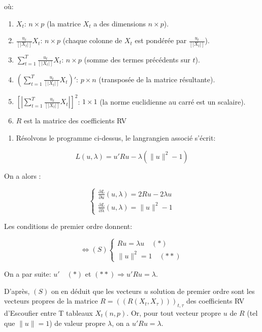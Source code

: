 \documentclass[
]{article}
\providecommand{\tightlist}{%
  \setlength{\itemsep}{0pt}\setlength{\parskip}{0pt}}
\begin{document}
où:

\begin{enumerate}
\def\labelenumi{\arabic{enumi}.}
\tightlist
\item
  \(X_t\): \(n \times p\) (la matrice \(X_t\) a des dimensions
  \(n \times p\)).
\item
  \(\frac{u_t}{\left[\left| X_t \right|\right]} X_t\): \(n \times p\)
  (chaque colonne de \(X_t\) est pondérée par
  \(\frac{u_t}{\left[\left| X_t \right|\right]}\)).
\item
  \(\sum_{t=1}^{T} \frac{u_t}{\left[\left| X_t \right|\right]} X_t\):
  \(n \times p\) (somme des termes précédents sur \(t\)).
\item
  \(\left(\sum_{t=1}^{T} \frac{u_t}{\left[\left| X_t \right|\right]} X_t\right)'\):
  \(p \times n\) (transposée de la matrice résultante).
\item
  \(\left[\left| \sum_{t=1}^{T} \frac{u_t}{\left[\left| X_t \right|\right]} X_t \right|\right]^2\):
  \(1 \times 1\) (la norme euclidienne au carré est un scalaire).
\item
  \(R\) est la matrice des coefficients RV
\end{enumerate}

\begin{enumerate}
\def\labelenumi{\alph{enumi})}
\setcounter{enumi}{1}
\tightlist
\item
  Résolvons le programme ci-dessus, le langrangien associé s'écrit:
\end{enumerate}

\[L(u,\lambda) = u'R u - \lambda (\|u\|^2-1) \]

On a alors :

\[
\begin{cases}
  \frac{\partial L}{\partial u}(u,\lambda) = 2Ru - 2\lambda u \\
  \frac{\partial L}{\partial \lambda}(u,\lambda) = \|u\|^2 - 1
\end{cases}
\]

Les conditions de premier ordre donnent:

\[\iff (S)
\begin{cases}
  Ru  = \lambda u \quad (*) \\
  \|u\|^2 = 1 \quad (**)
\end{cases}
\]

On a par suite: \(u' \quad (*)\) et \((**) \Rightarrow u'Ru = \lambda\).

D'après, \((S)\) on en déduit que les vecteurs \(u\) solution de premier
ordre sont les vecteurs propres de la matrice
\(R = ((R(X_t,X_{\tau} )))_{t,\tau}\) des coefficients RV d'Escoufier
entre T tableaux \(X_t(n , p)\). Or, pour tout vecteur propre \(u\) de
\(R\) (tel que \(\|u\| = 1\)) de valeur propre \(\lambda\), on a
\(u'Ru = \lambda\).
\end{document}
